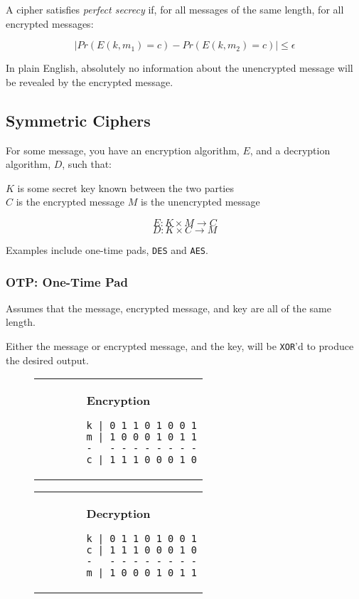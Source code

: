 \documentclass{article}
\begin{document}
A cipher satisfies \textit{perfect secrecy} if, for all messages of the same length, for all encrypted messages:

\[ | Pr(E(k, m_1) = c) - Pr(E(k, m_2) = c) | \leq \epsilon \]

In plain English, absolutely no information about the unencrypted message will be revealed by the encrypted message.

\subsection{Symmetric Ciphers}

For some message, you have an encryption algorithm, $E$, and a decryption algorithm, $D$, such that:
\vspace{.5cm}
\begin{center}
  $K$ is some secret key known between the two parties\\
  $C$ is the encrypted message
  $M$ is the unencrypted message
\end{center}

\[ E : K \times M \rightarrow C\]
\[ D : K \times C \rightarrow M\]

Examples include one-time pads, \texttt{DES} and \texttt{AES}.

\subsubsection{OTP: One-Time Pad}

Assumes that the message, encrypted message, and key are all of the same length.

Either the message or encrypted message, and the key, will be \texttt{XOR}'d to produce the desired output.

\begin{figure}[!htb]
  \begin{minipage}{0.5\textwidth}
    \begin{tabular}{c}
      \textbf{Encryption}
      \begin{lstlisting}
        k | 0 1 1 0 1 0 0 1
        m | 1 0 0 0 1 0 1 1
        -   - - - - - - - -
        c | 1 1 1 0 0 0 1 0
      \end{lstlisting}
    \end{tabular}
  \end{minipage}%
  \begin{minipage}{0.5\textwidth}
    \begin{tabular}{c}
      \textbf{Decryption}
      \begin{lstlisting}
        k | 0 1 1 0 1 0 0 1
        c | 1 1 1 0 0 0 1 0
        -   - - - - - - - -
        m | 1 0 0 0 1 0 1 1
      \end{lstlisting}
    \end{tabular}
  \end{minipage}%
\end{figure}
\end{document}
